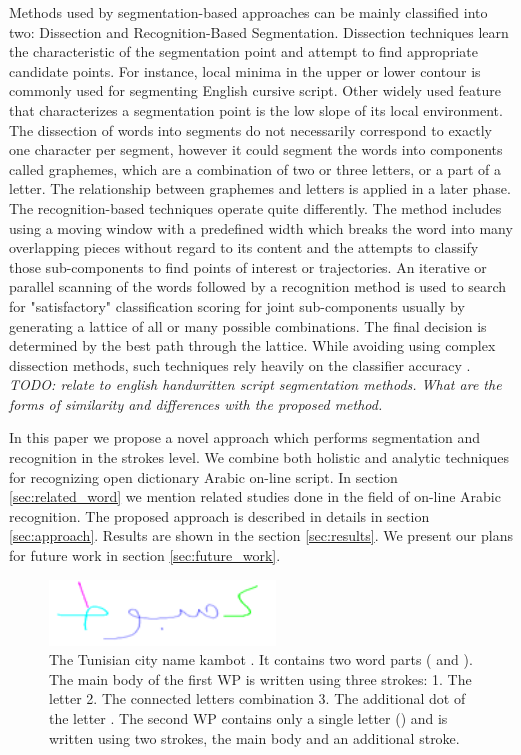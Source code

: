\documentclass[journal,compsoc]{IEEEtran}
\begin{document}
Methods used by segmentation-based approaches can be mainly classified into two: Dissection and Recognition-Based Segmentation. Dissection techniques learn the characteristic of the segmentation point and attempt to find appropriate candidate points. For instance, local minima in the upper or lower contour is commonly used for segmenting English cursive script. Other widely used feature that characterizes a segmentation point is the low slope of its local environment. The dissection of words into segments do not necessarily correspond to exactly one character per segment, however it could segment the words into components called graphemes, which are a combination of two or three letters, or a part of a letter. The relationship between graphemes and letters is applied in a later phase. The recognition-based techniques operate quite differently. The method includes using a moving window with a predefined width which breaks the word into many overlapping pieces without regard to its content and the attempts to classify those sub-components to find points of interest or trajectories. An iterative or parallel scanning of the words followed by a recognition method is used to search for "satisfactory" classification scoring for joint sub-components usually by generating a lattice of all or many possible combinations. The final decision is determined by the best path through the lattice. While avoiding using complex dissection methods, such techniques rely heavily on the classifier accuracy \cite{casey1996survey}. \\

\emph{TODO: relate to english handwritten script segmentation methods. What are the forms of similarity and differences with the proposed method.}

In this paper we propose a novel approach which performs segmentation and recognition in the strokes level. We combine both holistic and analytic techniques for recognizing open dictionary Arabic on-line script. In section \ref{sec:related_word} we mention related studies done in the field of on-line Arabic recognition. The proposed approach is described in details in section \ref{sec:approach}. Results are shown in the section \ref{sec:results}. We present our plans for future work in section \ref{sec:future_work}.

\begin{figure}
\centering
\includegraphics[width=6cm]{./figures/kmbot_color}       
\caption{The Tunisian city name kambot . It contains two word parts ( and ). The main body of the first WP is written using three strokes: 1. The letter  2. The connected letters combination  3. The additional dot of the letter . The second WP contains only a single letter () and is written using two strokes, the main body and an additional stroke.}
\label{fig:kmbot}
\end{figure}
\end{document}
